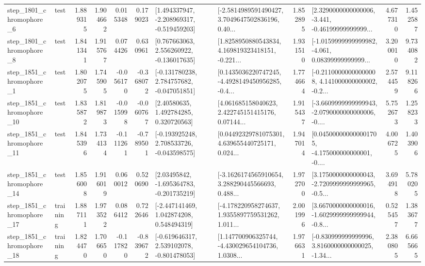 \begin{tabular}{llrrrrllrlrr}
  step\_1801\_chromophore\_6 &      test &      1.889315 &    1.904662 &      0.015348 &  0.179023 &   [1.494337947, -2.208969317, -0.519459203] &  [-2.5814989591490427, 3.7049647502836196, 0.40... &       1.852895 &  [2.3290000000000006, -3.441, -0.46199999999999... &            4.677310 &          1.452587 \\
  step\_1801\_chromophore\_8 &      test &      1.841341 &    1.915767 &      0.074426 &  0.630961 &    [0.767663063, 2.556260922, -0.136017635] &  [1.8258950880543834, 4.169819323418151, -0.221... &       1.931510 &  [-1.0159999999999982, -4.061, 0.08399999999999... &            3.200010 &          9.734082 \\
  step\_1851\_chromophore\_1 &      test &      1.802075 &    1.745905 &     -0.056170 & -0.368072 &   [-0.131780238, 2.784757682, -0.047051851] &  [0.1435036220747245, -4.4928149450956285, -0.4... &       1.774664 &  [-0.21100000000000008, 4.141000000000002, -0.2... &            2.574459 &          9.118266 \\
 step\_1851\_chromophore\_10 &      test &      1.835872 &    1.819873 &     -0.015998 & -0.060767 &      [2.40580635, 1.492784285, 0.320720563] &  [4.061685158040623, 2.422745151415176, 0.07144... &       1.915437 &  [-3.6609999999999943, -2.0790000000000006, -0.... &            5.752673 &          1.258233 \\
 step\_1851\_chromophore\_11 &      test &      1.845396 &    1.734134 &     -0.111261 & -0.789501 &   [-0.193925248, 2.708533726, -0.043598575] &  [0.04492329781075301, 4.639655440725171, 0.024... &       1.947014 &  [0.045000000000001705, -4.175000000000001, -0.... &            4.006725 &          1.403906 \\
 step\_1851\_chromophore\_14 &      test &      1.856008 &    1.916019 &      0.060012 &  0.520690 &    [2.03495842, -1.695364783, -0.201735219] &  [-3.1626174565910654, 3.288290445566693, 0.488... &       1.972700 &  [3.1750000000000043, -2.7209999999999965, -0.5... &            3.694918 &          5.780205 \\
 step\_1851\_chromophore\_17 &  training &      1.887111 &    1.973522 &      0.086412 &  0.722646 &    [-2.447141469, 1.042874208, 0.548494319] &  [-4.178220958274637, 1.9355897759531262, 1.011... &       2.001996 &  [3.6670000000000016, -1.6029999999999944, -0.8... &            0.525457 &          1.383677 \\
 step\_1851\_chromophore\_18 &  training &      1.824470 &    1.706650 &     -0.117820 & -0.839672 &   [-0.619646317, 2.539102078, -0.801478053] &  [1.147700906325744, -4.430029654104736, 1.0308... &       1.976631 &  [-0.830999999999996, 3.8160000000000025, -1.34... &            2.380805 &          6.665665 \\

\end{tabular}
